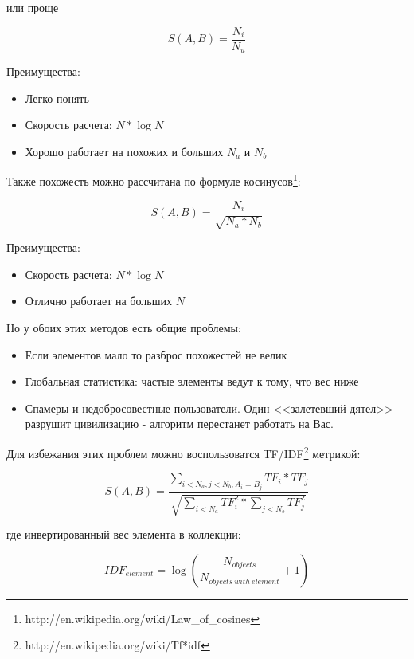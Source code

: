 или проще

\begin{equation}
 \label{eq:smlar2}
 S(A,B) = \frac{N_{i}}{N_{u}}
\end{equation}

Преимущества:

\begin{itemize}
\item Легко понять
\item Скорость расчета: $N * \log{N}$
\item Хорошо работает на похожих и больших $N_a$ и $N_b$
\end{itemize}

Также похожесть можно рассчитана по формуле косинусов\footnote{http://en.wikipedia.org/wiki/Law\_of\_cosines}:

\begin{equation}
 \label{eq:smlar3}
 S(A,B) = \frac{N_{i}}{\sqrt{N_{a}*N_{b}}}
\end{equation}

Преимущества:

\begin{itemize}
\item Скорость расчета: $N * \log{N}$
\item Отлично работает на больших $N$
\end{itemize}

Но у обоих этих методов есть общие проблемы:

\begin{itemize}
\item Если элементов мало то разброс похожестей не велик
\item Глобальная статистика: частые элементы ведут к тому, что вес ниже
\item Спамеры и недобросовестные пользователи. Один <<залетевший дятел>> разрушит цивилизацию - алгоритм перестанет работать на Вас.
\end{itemize}

Для избежания этих проблем можно воспользоватся TF/IDF\footnote{http://en.wikipedia.org/wiki/Tf*idf} метрикой:

\begin{equation}
 \label{eq:smlar4}
 S(A,B) = \frac{\sum_{i < N_{a}, j < N_{b}, A_{i} = B_{j}}TF_{i} * TF_{j}}{\sqrt{\sum_{i < N_{a}}TF_{i}^{2} * \sum_{j < N_{b}}TF_{j}^{2}}}
\end{equation}

где инвертированный вес элемента в коллекции:

\begin{equation}
 \label{eq:smlar5}
 IDF_{element} = \log{(\frac{N_{objects}}{N_{objects\ with\ element}} + 1)}
\end{equation}

